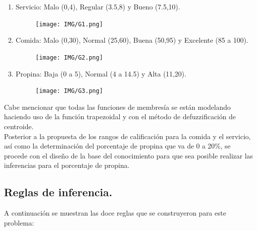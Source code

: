 \documentclass[11pt, letterpaper]{article}
\begin{document}
\begin{enumerate}
	\item Servicio: Malo (0,4), Regular (3.5,8) y Bueno (7.5,10).
	\begin{figure}[h]
		\centering
		\texttt{[image: IMG/G1.png]}
	\end{figure}
	
	\item Comida: Malo (0,30), Normal (25,60), Buena (50,95) y Excelente (85 a 100).
	\begin{figure}[h]
		\centering
		\texttt{[image: IMG/G2.png]}
	\end{figure}
	\newpage
	\item Propina: Baja (0 a 5), Normal (4 a 14.5) y Alta (11,20).
	\begin{figure}[h]
		\centering
		\texttt{[image: IMG/G3.png]}
	\end{figure}
\end{enumerate}

Cabe mencionar que todas las funciones de membresía se están modelando haciendo uso de la función trapezoidal y con el método de defuzzificación de centroide. \\

Posterior a la propuesta de los rangos de calificación para la comida y el servicio, así como la determinación del porcentaje de propina que va de 0 a 20\%, se procede con el diseño de la base del conocimiento para que sea posible realizar las inferencias para el porcentaje de propina.

\subsection{Reglas de inferencia.}

A continuación se muestran las doce reglas que se construyeron para este problema:
\end{document}

